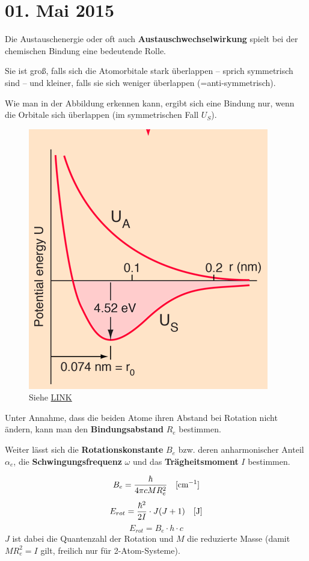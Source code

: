 \section{01. Mai 2015}
\label{q:1}

Die Austauschenergie oder oft auch \textbf{Austauschwechselwirkung} spielt bei der chemischen Bindung eine bedeutende Rolle.

Sie ist groß, falls sich die Atomorbitale stark überlappen -- sprich symmetrisch sind -- und kleiner, falls sie sich weniger überlappen (=anti-symmetrisch).

Wie man in der Abbildung erkennen kann, ergibt sich eine Bindung nur, wenn die Orbitale sich überlappen (im symmetrischen Fall $U_S$).

\begin{figure}[H]
    \centering
    \includegraphics[width=.4\textwidth]{resources/05-01-2015/Frage1.png}
    \caption{Siehe \href{http://hyperphysics.phy-astr.gsu.edu/hbase/molecule/hmol.html}{LINK}}
\end{figure}

\label{q:2}

Unter Annahme, dass die beiden Atome ihren Abstand bei Rotation nicht ändern, kann man den \textbf{Bindungsabstand} $R_e$ bestimmen.

Weiter lässt sich die \textbf{Rotationskonstante} $B_e$ bzw. deren anharmonischer Anteil $\alpha_e$, die \textbf{Schwingungsfrequenz} $\omega$ und das \textbf{Trägheitsmoment} $I$ bestimmen.

\[B_e = \frac{\hbar}{4 \pi c M R_e^2}\text{\quad [cm$^{-1}$]}\]
\[E_{rot} = \frac{\hbar^2}{2 I} \cdot J(J+1)\text{\quad [J]}\]
\[E_{rot} = B_e \cdot h\cdot c\]
$J$ ist dabei die Quantenzahl der Rotation und $M$ die reduzierte Masse (damit $MR_e^2=I$ gilt, freilich nur für 2-Atom-Systeme).

